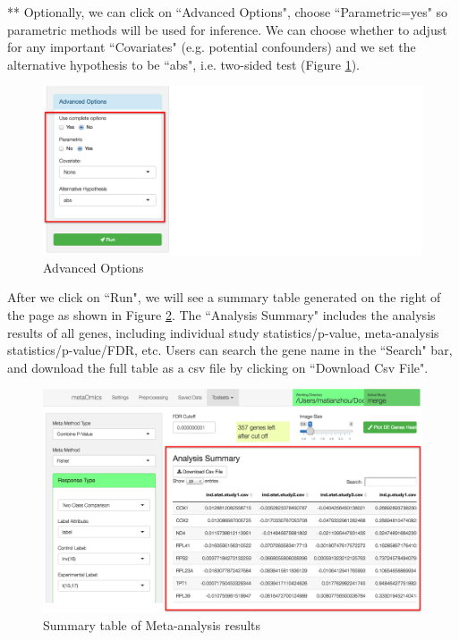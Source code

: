 ** Optionally, we can click on ``Advanced Options", choose ``Parametric=yes" so parametric methods will be used for inference. We can choose whether to adjust for any important ``Covariates" (e.g. potential confounders) and we set the alternative hypothesis to be ``abs", i.e. two-sided test (Figure \ref{fig:AdvOptions}). 

\begin{figure}[H]
\begin{center}
\includegraphics[scale=0.45]{./figure/metaDE/AdvOptions}
\caption{Advanced Options}
\label{fig:AdvOptions}
\end{center}
\end{figure}

After we click on ``Run", we will see a summary table generated on the right of the page as shown in Figure \ref{fig:MetaSummary}. The ``Analysis Summary" includes the analysis results of all genes, including individual study statistics/p-value, meta-analysis statistics/p-value/FDR, etc. Users can search the gene name in the ``Search" bar, and download the full table as a csv file by clicking on ``Download Csv File".  

\begin{figure}[H]
\begin{center}
\includegraphics[scale=0.45]{./figure/metaDE/MetaSummary}
\caption{Summary table of Meta-analysis results}
\label{fig:MetaSummary}
\end{center}
\end{figure}

